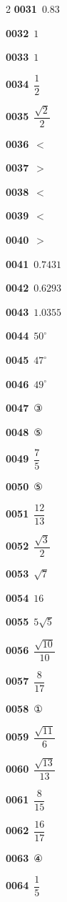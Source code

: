 \documentclass[10pt,a4paper]{article}
\begin{document}
\begin{multicols}{2}
\noindent\textbf{0031}\ $0.83$\par
\noindent\textbf{0032}\ $1$\par
\noindent\textbf{0033}\ $1$\par
\noindent\textbf{0034}\ $\dfrac{1}{2}$\par
\noindent\textbf{0035}\ $\dfrac{\sqrt{2}}{2}$\par
\noindent\textbf{0036}\ $<$\par
\noindent\textbf{0037}\ $>$\par
\noindent\textbf{0038}\ $<$\par
\noindent\textbf{0039}\ $<$\par
\noindent\textbf{0040}\ $>$\par
\noindent\textbf{0041}\ $0.7431$\par
\noindent\textbf{0042}\ $0.6293$\par
\noindent\textbf{0043}\ $1.0355$\par
\noindent\textbf{0044}\ $50^\circ$\par
\noindent\textbf{0045}\ $47^\circ$\par
\noindent\textbf{0046}\ $49^\circ$\par
\noindent\textbf{0047}\ ③\par
\noindent\textbf{0048}\ ⑤\par
\noindent\textbf{0049}\ $\dfrac{7}{5}$\par
\noindent\textbf{0050}\ ⑤\par
\noindent\textbf{0051}\ $\dfrac{12}{13}$\par
\noindent\textbf{0052}\ $\dfrac{\sqrt{3}}{2}$\par
\noindent\textbf{0053}\ $\sqrt{7}$\par
\noindent\textbf{0054}\ $16$\par
\noindent\textbf{0055}\ $5\sqrt{5}$\par
\noindent\textbf{0056}\ $\dfrac{\sqrt{10}}{10}$\par
\noindent\textbf{0057}\ $\dfrac{8}{17}$\par
\noindent\textbf{0058}\ ①\par
\noindent\textbf{0059}\ $\dfrac{\sqrt{11}}{6}$\par
\noindent\textbf{0060}\ $\dfrac{\sqrt{13}}{13}$\par
\noindent\textbf{0061}\ $\dfrac{8}{15}$\par
\noindent\textbf{0062}\ $\dfrac{16}{17}$\par
\noindent\textbf{0063}\ ④\par
\noindent\textbf{0064}\ $\dfrac{1}{5}$\par

\end{multicols}
\end{document}
